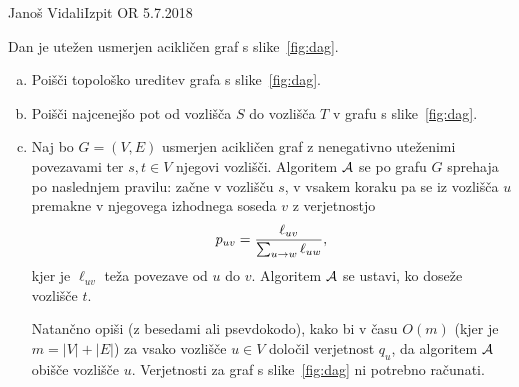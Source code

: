 \begin{naloga}{Janoš Vidali}{Izpit OR 5.7.2018}
\begin{vprasanje}
Dan je utežen usmerjen acikličen graf s slike~\ref{fig:dag}.

\begin{enumerate}[(a)]
\item Poišči topološko ureditev grafa s slike~\ref{fig:dag}.

\item Poišči najcenejšo pot od vozlišča $S$ do vozlišča $T$
v grafu s slike~\ref{fig:dag}.

\item Naj bo $G = (V, E)$ usmerjen acikličen graf
z nenegativno uteženimi povezavami
ter $s, t \in V$ njegovi vozlišči.
Algoritem $\mathcal{A}$ se po grafu $G$ sprehaja po naslednjem pravilu:
začne v vozlišču $s$,
v vsakem koraku pa se iz vozlišča $u$ premakne
v njegovega izhodnega soseda $v$ z verjetnostjo
$$
p_{uv} = {\ell_{uv} \over \sum_{u \to w} \ell_{uw}} ,
$$
kjer je $\ell_{uv}$ teža povezave od $u$ do $v$.
Algoritem $\mathcal{A}$ se ustavi, ko doseže vozlišče $t$.

Natančno opiši (z besedami ali psevdokodo),
kako bi v času $O(m)$ (kjer je $m = |V| + |E|$)
za vsako vozlišče $u \in V$ določil verjetnost $q_u$,
da algoritem $\mathcal{A}$ obišče vozlišče $u$.
Verjetnosti za graf s slike~\ref{fig:dag} ni potrebno računati.
\end{enumerate}

\begin{figure}[t]
\centering
{}
\end{figure}
\end{vprasanje}
\end{naloga}
